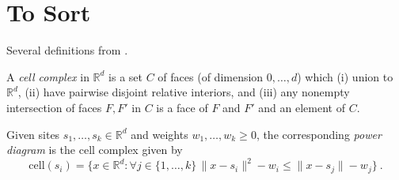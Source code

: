 \documentclass[anon,12pt]{colt2019}
\newcommand{\Comments}{1}
\newcommand{\mynote}[2]{\ifnum\Comments=1\textcolor{#1}{#2}\fi}
\newcommand{\jessie}[1]{\mynote{purple}{[JF: #1]}}
\newcommand{\reals}{\mathbb{R}}
\newcommand{\cell}{\mathrm{cell}}
\newcommand{\inter}[1]{\mathring{#1}}%
\newcommand{\conv}{\mathrm{conv}}
\begin{document}





\section{To Sort}

Several definitions from \citet{aurenhammer1987power}.
\begin{definition}
  A \emph{cell complex} in $\reals^d$ is a set $C$ of faces (of dimension $0,\ldots,d$) which (i) union to $\reals^d$, (ii) have pairwise disjoint relative interiors, and (iii) any nonempty intersection of faces $F,F'$ in $C$ is a face of $F$ and $F'$ and an element of $C$.
\end{definition}

\begin{definition}
  Given sites $s_1,\ldots,s_k\in\reals^d$ and weights $w_1,\ldots,w_k \geq 0$, the corresponding \emph{power diagram} is the cell complex given by
  \begin{equation}
    \label{eq:pd}
    \cell(s_i) = \{ x \in\reals^d : \forall j \in \{1,\ldots,k\} \, \|x - s_i\|^2 - w_i \leq \|x - s_j\| - w_j\}~.
  \end{equation}
\end{definition}
\end{document}

